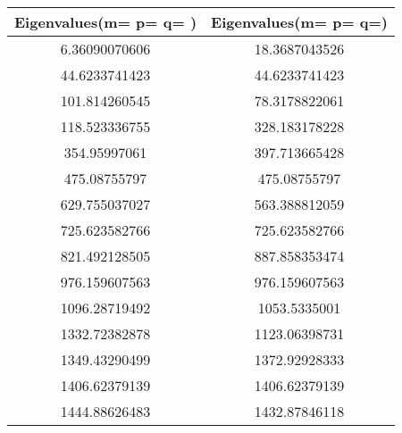 \begin{tabular}{c |c} 
Eigenvalues(m= p= q= ) & Eigenvalues(m= p= q=) \\ 
\hline\hline
6.36090070606 & 18.3687043526\\ 
\hline
44.6233741423 & 44.6233741423\\ 
\hline
101.814260545 & 78.3178822061\\ 
\hline
118.523336755 & 328.183178228\\ 
\hline
354.95997061 & 397.713665428\\ 
\hline
475.08755797 & 475.08755797\\ 
\hline
629.755037027 & 563.388812059\\ 
\hline
725.623582766 & 725.623582766\\ 
\hline
821.492128505 & 887.858353474\\ 
\hline
976.159607563 & 976.159607563\\ 
\hline
1096.28719492 & 1053.5335001\\ 
\hline
1332.72382878 & 1123.06398731\\ 
\hline
1349.43290499 & 1372.92928333\\ 
\hline
1406.62379139 & 1406.62379139\\ 
\hline
1444.88626483 & 1432.87846118\\ 
\hline
\end{tabular}